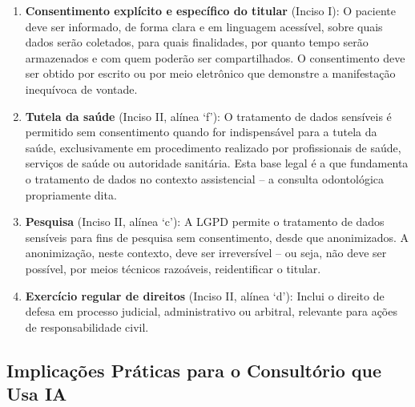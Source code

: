\begin{enumerate}
  \item \textbf{Consentimento explícito e específico do titular} (Inciso I):
    O paciente deve ser informado, de forma clara e em linguagem acessível,
    sobre quais dados serão coletados, para quais finalidades, por quanto tempo
    serão armazenados e com quem poderão ser compartilhados. O consentimento
    deve ser obtido por escrito ou por meio eletrônico que demonstre a
    manifestação inequívoca de vontade.

  \item \textbf{Tutela da saúde} (Inciso II, alínea `f'): O tratamento de dados
    sensíveis é permitido sem consentimento quando for indispensável para a
    tutela da saúde, exclusivamente em procedimento realizado por profissionais
    de saúde, serviços de saúde ou autoridade sanitária. Esta base legal é a
    que fundamenta o tratamento de dados no contexto assistencial -- a consulta
    odontológica propriamente dita.

  \item \textbf{Pesquisa} (Inciso II, alínea `c'): A LGPD permite o tratamento
    de dados sensíveis para fins de pesquisa sem consentimento, desde que
    anonimizados. A anonimização, neste contexto, deve ser irreversível -- ou
    seja, não deve ser possível, por meios técnicos razoáveis, reidentificar o
    titular.

  \item \textbf{Exercício regular de direitos} (Inciso II, alínea `d'): Inclui
    o direito de defesa em processo judicial, administrativo ou arbitral,
    relevante para ações de responsabilidade civil.
\end{enumerate}


\subsection{Implicações Práticas para o Consultório que Usa IA}

